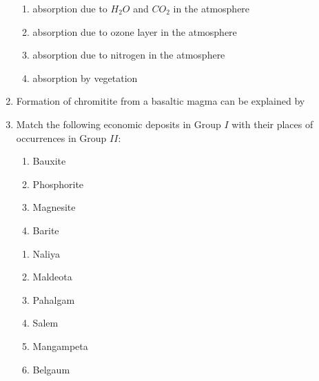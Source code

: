 \documentclass[journal,12pt,onecolumn,fleqn]{IEEEtran}
\theoremstyle{remark}
\theoremstyle{remark}
\begin{document}
\begin{enumerate}[label=Q.\arabic*.]
        \begin{enumerate}
                \item absorption due to $H_2O$ and $CO_2$ in the atmosphere
                \item absorption due to ozone layer in the atmosphere
                \item absorption due to nitrogen in the atmosphere
                \item absorption by vegetation               
            \end{enumerate}
    \item Formation of chromitite from a basaltic magma can be explained by \hfill{} 
        \begin {enumerate}
            \end{enumerate}
    \item Match the following economic deposits in Group $I$ with their places of occurrences in Group $II$: \hfill{} \\
\begin{multicols}{2}
            \begin{enumerate}[label=(\Alph*),start=16]
                \item Bauxite
                \item Phosphorite
                \item Magnesite
                \item Barite
            \end{enumerate}
            
            \columnbreak
            
            \begin{enumerate}[label=\arabic*.]
                \item Naliya
                \item Maldeota
                \item Pahalgam
                \item Salem
                \item Mangampeta
                \item Belgaum
            \end{enumerate}
            


\end{multicols}
\end{enumerate}
\end{document}
